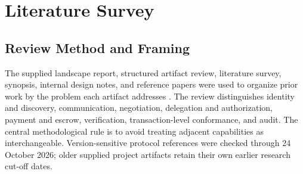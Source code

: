 \documentclass[12pt,a4paper,oneside]{report}
\begin{document}
\chapter{Literature Survey}
\section{Review Method and Framing}
The supplied landscape report, structured artifact review, literature survey, synopsis, internal design notes, and reference papers were used to organize prior work by the problem each artifact addresses \cite{feinlandscape,feinreview,feinsurvey,feinsynopsis}. The review distinguishes identity and discovery, communication, negotiation, delegation and authorization, payment and escrow, verification, transaction-level conformance, and audit. The central methodological rule is to avoid treating adjacent capabilities as interchangeable. Version-sensitive protocol references were checked through 24 October 2026; older supplied project artifacts retain their own earlier research cut-off dates.
\end{document}
